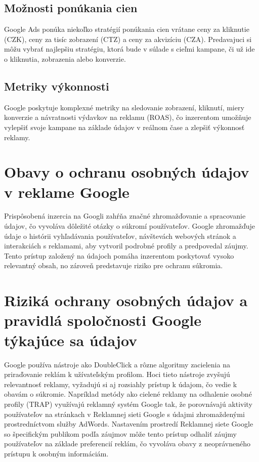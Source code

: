 \documentclass[10pt,slovak,a4paper]{article}
\begin{document}
\subsection{Možnosti ponúkania cien}
Google Ads ponúka niekoľko stratégií ponúkania cien vrátane ceny za kliknutie (CZK), ceny za tisíc zobrazení (CTZ) a 
ceny za akvizíciu (CZA). Predavajuci si môžu vybrať najlepšiu stratégiu, ktorá bude v súlade s cieľmi kampane, či už ide 
o kliknutia, zobrazenia alebo konverzie.\cite{10574622}
\subsection{Metriky výkonnosti}
Google poskytuje komplexné metriky na sledovanie zobrazení, kliknutí, miery konverzie a návratnosti výdavkov na reklamu
 (ROAS), čo inzerentom umožňuje vylepšiť svoje kampane na základe údajov v reálnom čase a zlepšiť výkonnosť reklamy.

\section{Obavy o ochranu osobných údajov v reklame Google}
Prispôsobená inzercia na Googli zahŕňa značné zhromažďovanie a spracovanie údajov, čo vyvoláva dôležité otázky o 
súkromí používateľov. Google zhromažďuje údaje o histórii vyhľadávania používateľov, návštevách webových stránok a 
interakciách s reklamami, aby vytvoril podrobné profily a predpovedal záujmy. Tento prístup založený na údajoch pomáha 
inzerentom poskytovať vysoko relevantný obsah, no zároveň predstavuje riziko pre ochranu súkromia.\cite{7368607}

\section{Riziká ochrany osobných údajov a pravidlá spoločnosti Google týkajúce sa údajov}
Google používa nástroje ako DoubleClick a rôzne algoritmy zacielenia na priraďovanie reklám k užívateľským profilom. 
Hoci tieto nástroje zvyšujú relevantnosť reklamy, vyžadujú si aj rozsiahly prístup k údajom, čo vedie k obavám o 
súkromie. Napríklad metódy ako cielené reklamy na odhalenie osobné profily (TRAP) využívajú reklamný systém Google 
tak, že porovnávajú aktivity používateľov na stránkach v Reklamnej sieti Google s údajmi zhromaždenými prostredníctvom 
služby AdWords. Nastavením prostredí Reklamnej siete Google so špecifickým publikom podľa záujmov môže tento prístup 
odhaliť záujmy používateľov na základe preferencií reklám, čo vyvoláva obavy z neoprávneného prístupu k osobným 
informáciám.\cite{8526633}\cite{7737411}
\end{document}
